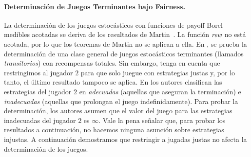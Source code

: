 
	
\paragraph{Determinación de Juegos Terminantes bajo Fairness.}


La determinación de los juegos estocásticos con funciones de payoff Borel-medibles acotadas se deriva de los resultados de Martin~\cite{Martin98}. La función $\textit{rew}$ no está acotada, por lo que los teoremas de Martin no se aplican a ella. En \cite{FilarV96}, se prueba la determinación de una clase general de juegos estocásticos terminantes (llamados \emph{transitorios}) con recompensas totales. Sin embargo, tenga en cuenta que restringimos al jugador $2$ para que solo juegue con estrategias justas y, por lo tanto, el último resultado tampoco se aplica.
%
En \cite{PatekBertsekas99} los autores clasifican las estrategias del jugador $2$ en \emph{adecuadas} (aquellas que aseguran la terminación) e \emph{inadecuadas} (aquellas que prolongan el juego indefinidamente). Para probar la determinación, los autores asumen que el valor del juego para las estrategias inadecuadas del jugador $2$ es $\infty$. Vale la pena señalar que, para probar los resultados a continuación, no hacemos ninguna asunción sobre estrategias injustas.
%
A continuación demostramos que restringir a jugadas justas no afecta la determinación de los juegos.

